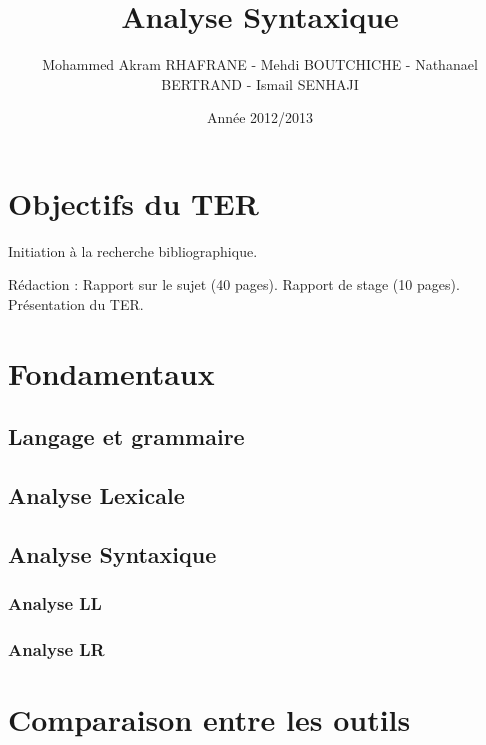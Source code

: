\documentclass{beamer}
\title[Analyse Syntaxique]{Analyse Syntaxique}
\author{Mohammed Akram RHAFRANE - Mehdi BOUTCHICHE - Nathanael BERTRAND - Ismail SENHAJI}
\institute{Université de Toulouse III/IRIT}
\date{Année 2012/2013}
\begin{document}
\begin{frame}
  \titlepage
\end{frame}


\section{Objectifs du TER}\label{sec:Objectifs}

Initiation à la recherche bibliographique.

Rédaction :
\idem Rapport sur le sujet (40 pages).
\idem Rapport de stage (10 pages).
\idem Présentation du TER.



\frame

\section{Fondamentaux}

\subsection{Langage et grammaire}



\subsection{Analyse Lexicale}



\subsection{Analyse Syntaxique}



\subsubsection{Analyse LL}



\subsubsection{Analyse LR}



\section{Comparaison entre les outils}
\end{document}
